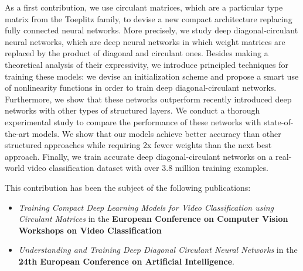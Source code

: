 
As a first contribution, we use circulant matrices, which are a particular type matrix from the Toeplitz family, to devise a new compact architecture replacing fully connected neural networks.
More precisely, we study deep diagonal-circulant neural networks, which are deep neural networks in which weight matrices are replaced by the product of diagonal and circulant ones.
Besides making a theoretical analysis of their expressivity, we introduce principled techniques for training these models: we devise an initialization scheme and propose a smart use of nonlinearity functions in order to train deep diagonal-circulant networks.
Furthermore, we show that these networks outperform recently introduced deep networks with other types of structured layers.
We conduct a thorough experimental study to compare the performance of these networks with state-of-the-art models. 
We show that our models achieve better accuracy than other structured approaches while requiring 2x fewer weights than the next best approach.
Finally, we train accurate deep diagonal-circulant networks on a real-world video classification dataset with over 3.8 million training examples.

\begin{mdframed}[
    topline=true,
    bottomline=true,
    rightline=true,
    linecolor=mydarkblue,
    linewidth=3pt,
    backgroundcolor=white,
    innerleftmargin=0.02\textwidth,
    innerrightmargin=0.02\textwidth,
    skipabove=0.5cm,
    skipbelow=0.5cm
  ]
  This contribution has been the subject of the following publications:
  \begin{itemize}[topsep=0pt,leftmargin=12pt]
    \setlength\itemsep{-0.3em}
    \item
      \emph{Training Compact Deep Learning Models for Video Classification using Circulant Matrices}
      in the \textbf{European Conference on Computer Vision Workshops on Video Classification}
    \item
      \emph{Understanding and Training Deep Diagonal Circulant Neural Networks} in the 
      \textbf{24th European Conference on Artificial Intelligence}.
  \end{itemize}
\end{mdframed}



